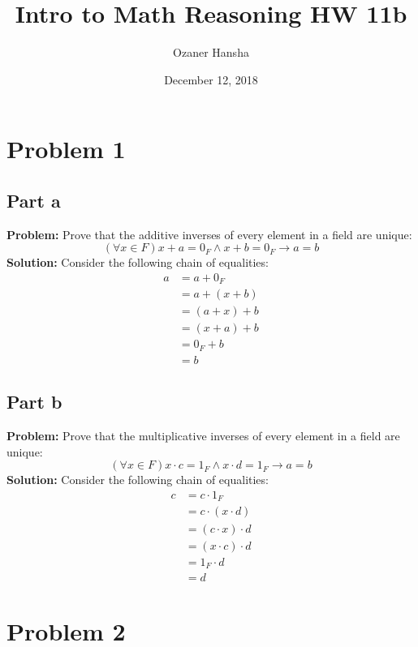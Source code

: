\documentclass{article}
\begin{document}
\title{Intro to Math Reasoning HW 11b}
\author{Ozaner Hansha}
\date{December 12, 2018}
\maketitle

\section*{Problem 1}
\subsection*{Part a}
\textbf{Problem:} Prove that the additive inverses of every element in a field are unique:
$$\left(\forall x\in F\right) x+a=0_F\wedge x+b=0_F\rightarrow a=b$$
\textbf{Solution:} Consider the following chain of equalities:
\begin{align*}
  a&=a+0_F\tag{additive identity}\\
  &=a+(x+b)\tag{given}\\
  &=(a+x)+b\tag{associativity $+$}\\
  &=(x+a)+b\tag{commutativity $+$}\\
  &=0_F+b\tag{given}\\
  &=b\tag{additive identity}
\end{align*}

\subsection*{Part b}
\textbf{Problem:} Prove that the multiplicative inverses of every element in a field are unique:
$$\left(\forall x\in F\right) x\cdot c=1_F\wedge x\cdot d=1_F\rightarrow a=b$$
\textbf{Solution:} Consider the following chain of equalities:
\begin{align*}
  c&=c\cdot 1_F\tag{multiplicative identity}\\
  &=c\cdot(x\cdot d)\tag{given}\\
  &=(c\cdot x)\cdot d\tag{associativity $\cdot$}\\
  &=(x\cdot c)\cdot d\tag{commutativity $\cdot$}\\
  &=1_F\cdot d\tag{given}\\
  &=d\tag{multiplicative identity}
\end{align*}

\section*{Problem 2}
\end{document}
